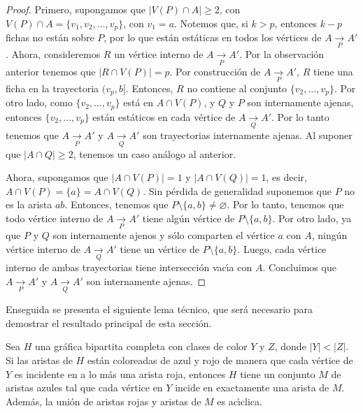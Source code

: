 \begin{proof}
    Primero, supongamos que $|V(P) \cap A| \geq 2$, con $V(P) \cap A = \{v_{1},
    v_{2}, \dots, v_{p}\}$, con $v_{1} = a$. Notemos que, si $k > p$, entonces
    $k-p$ fichas no est\'an sobre $P$, por lo que est\'an est\'aticas en todos
    los v\'ertices de $A \xrightarrow[P]{} A'$. Ahora, consideremos $R$ un
    v\'ertice interno de $A \xrightarrow[P]{} A'$. Por la observaci\'on anterior
    tenemos que  $|R \cap V(P)| = p$. Por construcci\'on de $A \xrightarrow[P]{}
    A'$, $R$ tiene una ficha en la trayectoria $(v_{p},b ]$. Entonces, $R$ no
    contiene al conjunto $\{v_{2}, \dots, v_{p}\}$. Por otro lado, como
    $\{v_{2}, \dots, v_{p}\}$ est\'a en $A \cap V(P)$, y $Q$ y $P$ son
    internamente ajenas, entonces $\{v_{2}, \dots, v_{p}\}$ est\'an est\'aticos
    en cada v\'ertice de $A \xrightarrow[Q]{} A'$. Por lo tanto tenemos que $A
    \xrightarrow[P]{} A'$ y $A \xrightarrow[Q]{}A'$ son trayectorias
    internamente ajenas. Al suponer que $|A \cap Q| \geq 2$, tenemos un caso
    an\'alogo al anterior.

    Ahora, supongamos que $|A \cap V(P)| = 1$ y $|A \cap V(Q)| = 1$, es decir,
    $A \cap V(P) = \{a\} = A \cap V(Q)$. Sin p\'erdida de generalidad suponemos
    que $P$ no es la arista $ab$. Entonces, tenemos que $P \setminus \{a,b\}
    \neq \varnothing$. Por lo tanto, tenemos que todo v\'ertice interno de $A
    \xrightarrow[P]{} A'$ tiene alg\'un v\'ertice de $P \setminus \{a, b\}$. Por
    otro lado, ya que $P$ y $Q$ son internamente ajenos y s\'olo comparten el
    v\'ertice $a$ con $A$, ning\'un v\'ertice interno de $A \xrightarrow[Q]{}
    A'$ tiene un v\'ertice de $P \setminus \{a, b\}$. Luego, cada v\'ertice
    interno de ambas trayectorias tiene intersecci\'on vac\'\i{}a con $A$.
    Concluimos que $A \xrightarrow[P]{} A'$ y $A \xrightarrow[Q]{} A'$ son
    internamente ajenas.
\end{proof}

Enseguida se presenta el siguiente lema t\'ecnico, que ser\'a necesario para
demostrar el resultado principal de esta secci\'on. 

\begin{lema}%
\label{lem:rb-bipGraph}
    Sea $H$ una gr\'afica bipartita completa con clases de color $Y$ y $Z$,
    donde $|Y|<|Z|$. Si las aristas de $H$ est\'an coloreadas de azul y rojo de
    manera que cada v\'ertice de $Y$ es incidente en a lo m\'as una arista roja,
    entonces $H$ tiene un conjunto $M$ de aristas azules tal que cada v\'ertice
    en $Y$ incide en exactamente una arista de $M$. Adem\'as, la uni\'on de
    aristas rojas y aristas de $M$ es ac\'\i{}clica.
\end{lema}

